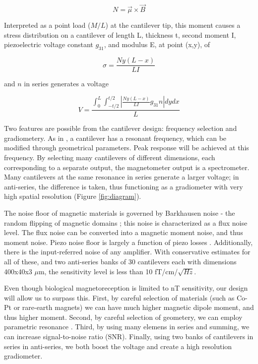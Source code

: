$$  N=\vec{\mu} \times \vec{B} $$

Interpreted as a point load ($M/L$) at the cantilever tip, this moment causes a stress distribution on a cantilever of length L, thickness t, second moment I, piezoelectric voltage constant $g_{31}$, and modulus E, at point (x,y), of

$$ \sigma=\frac{Ny(L-x)}{LI} $$

and $n$ in series generates a voltage

$$ V=\frac{\int_0^L\int_{-t/2}^{t/2}\left|\frac{Ny(L-x)}{LI}g_{31}n\right|dydx}{L} $$

Two features are possible from the cantilever design: frequency selection and gradiometery. As in \cite{shen2008design}, a cantilever has a resonant frequency, which can be modified through geometrical parameters. Peak response will be achieved at this frequency. By selecting many cantilevers of different dimensions, each corresponding to a separate output, the magnetometer output is a spectrometer. Many cantilevers at the same resonance in series generate a larger voltage; in anti-series, the difference is taken, thus functioning as a gradiometer with very high spatial resolution (Figure \ref{fig:diagram}).

The noise floor of magnetic materials is governed by Barkhausen noise - the random flipping of magnetic domains \cite{butta2012sources}; this noise is characterized as a flux noise level. The flux noise can be converted into a magnetic moment noise, and thus moment noise. Piezo noise floor is largely a function of piezo losses \cite{levinzon2004fundamental}. Additionally, there is the input-referred noise of any amplifier. With conservative estimates for all of these, and two anti-series banks of 30 cantilevers each with dimensions 400x40x3 $\mu$m, the sensitivity level is less than 10 fT/cm/$\sqrt{Hz}$.

 Even though biological magnetoreception is limited to nT sensitivity, our design will allow us to surpass this. First, by careful selection of materials (such as Co-Pt or rare-earth magnets) \cite{coey2010magnetism, arnold2009permanent} we can have much higher magnetic dipole moment, and thus higher moment. Second, by careful selection of geometery, we can employ parametric resonance \cite{van2006resonant}. Third, by using many elemens in series and summing, we can increase signal-to-noise ratio (SNR). Finally, using two banks of cantilevers in series in anti-series, we both boost the voltage and create a high resolution gradiometer.

